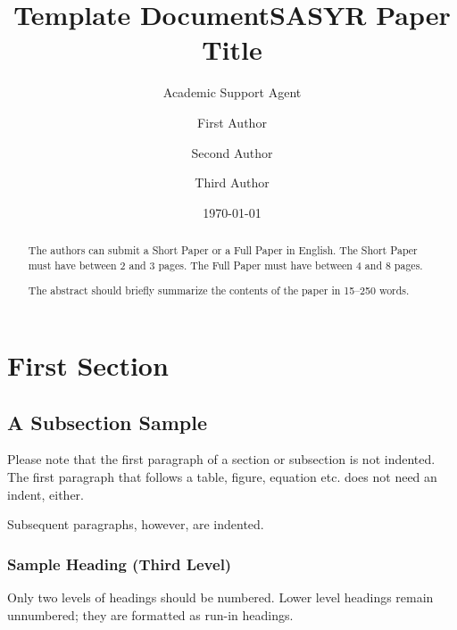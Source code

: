 \documentclass{article}
\title{Template Document}
\author{Academic Support Agent}
\date{\today}
\begin{document}
\maketitle

%
\title{SASYR Paper Title}
%
%
\author{First Author \and
Second Author \and
Third Author}
%
%
%
\maketitle              %
%
\begin{abstract}
The authors can submit a Short Paper or a Full Paper in English.
The Short Paper must have between 2 and 3 pages.
The Full Paper must have between 4 and 8 pages.

The abstract should briefly summarize the contents of the paper in
15--250 words. 


\end{abstract}
%
%
%
\section{First Section}
\subsection{A Subsection Sample}
Please note that the first paragraph of a section or subsection is
not indented. The first paragraph that follows a table, figure,
equation etc. does not need an indent, either.

Subsequent paragraphs, however, are indented.

\subsubsection{Sample Heading (Third Level)} Only two levels of
headings should be numbered. Lower level headings remain unnumbered;
they are formatted as run-in headings.
\end{document}
